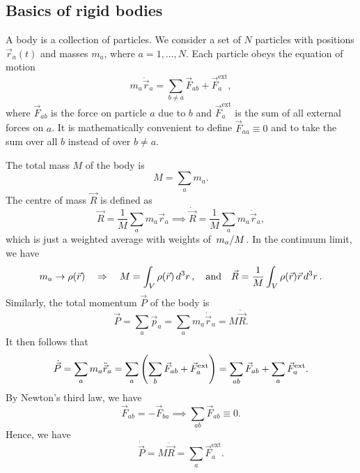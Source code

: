 \documentclass{article}
\begin{document}
\subsection{Basics of rigid bodies}
A body is a collection of particles. We consider a set of $N$ particles with positions $\vec{r}_{a}(t)$ and masses $m_{a}$, where $a = 1, \dots, N$. Each particle obeys the equation of motion
\begin{equation}
	m_{a}\ddot{\vec{r}}_a = \sum_{b \neq a} \vec{F}_{ab} + \vec{F}_a^{\mathrm{ext}},
\end{equation}
where $\vec{F}_{ab}$ is the force on particle $a$ due to $b$ and $ \vec{F}_{a}^{\text{ext}} $ is the sum of all external forces on $ a $. It is mathematically convenient to define $\vec{F}_{aa} \equiv 0$ and to take the sum over all $b$ instead of over $b \neq a$.
\par
The total mass $M$ of the body is
\begin{equation}
    M = \sum_a m_a.
\end{equation}
The centre of mass $\vec{R}$ is defined as
\begin{equation}
    \vec{R} = \frac{1}{M} \sum_a m_a \vec{r}_a \implies \dot{\vec{R}} = \frac{1}{M} \sum_a m_a \dot{\vec{r}}_a,
\end{equation}
which is just a weighted average with weights of $\flatfrac{m_{a}}{M}$. In the continuum limit, we have
\begin{equation}
    m_a \to \rho(\vec{r}) \implies M = \int_V \rho(\vec{r}) \dd[3]{r}, \qq{and} \vec{R} = \frac{1}{M} \int_V \rho(\vec{r}) \vec{r} \dd[3]{r}.
\end{equation}
Similarly, the total momentum $\vec{P}$ of the body is
\begin{equation}
    \vec{P} = \sum_a \vec{p}_a = \sum_a m_a \dot{\vec{r}}_a = M \dot{\vec{R}}.
\end{equation}
It then follows that
\begin{equation}
    \dot{\vec{P}} = \sum_a m_a \ddot{\vec{r}}_a = \sum_a \qty(\sum_b \vec{F}_{ab} + \vec{F}^{\text{ext}}_a) = \sum_{ab} \vec{F}_{ab} + \sum_a \vec{F}^{\text{ext}}_{a}.
\end{equation}
By Newton's third law, we have 
\begin{equation}
    \vec{F}_{ab} = - \vec{F}_{ba} \implies \sum_{ab} \vec{F}_{ab} \equiv 0.
\end{equation}
Hence, we have
\begin{equation}
    \dot{\vec{P}} = M \ddot{\vec{R}} = \sum_a \vec{F}^{\text{ext}}_{a}.
\end{equation}
\end{document}
